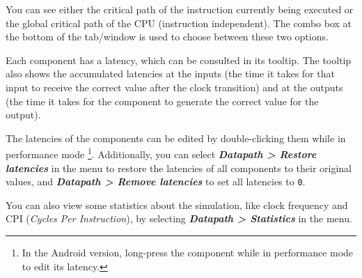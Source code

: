 \documentclass[11pt,a4paper,twoside,titlepage]{article}
\newcommand{\menupath}[1]{\textbf{\emph{#1}}}
\begin{document}
You can see either the critical path of the instruction currently being
executed or the global critical path of the CPU (instruction independent).
The combo box at the bottom of the tab/window is used to choose between
these two options.

Each component has a latency, which can be consulted in its tooltip.
The tooltip also shows the accumulated latencies at the inputs (the time it
takes for that input to receive the correct value after the clock transition)
and at the outputs (the time it takes for the component to generate the
correct value for the output).

The latencies of the components can be edited by double-clicking them while
in performance mode \footnote{In the Android version, long-press the 
component while in performance mode to edit its latency.}.
Additionally, you can select \menupath{Datapath > Restore latencies} in the
menu to restore the latencies of all components to their original values,
and \menupath{Datapath > Remove latencies} to set all latencies to \verb+0+.

You can also view some statistics about the simulation, like clock frequency
and CPI (\emph{Cycles Per Instruction}), by selecting 
\menupath{Datapath > Statistics} in the menu.
\end{document}
